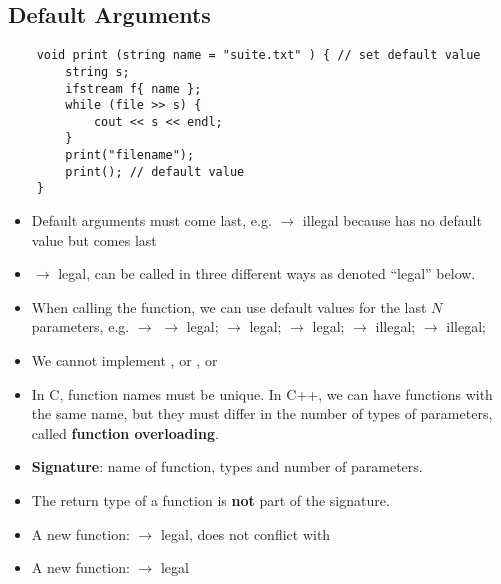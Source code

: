 \subsection{Default Arguments}
\begin{lstlisting}
    void print (string name = "suite.txt" ) { // set default value
        string s;
        ifstream f{ name };
        while (file >> s) {
            cout << s << endl;
        }
        print("filename");
        print(); // default value
    }
\end{lstlisting}
\begin{itemize}
    \item Default arguments must come last, e.g. 
    $ \rightarrow $  illegal because  has no default value but comes last
    \item {} $ \rightarrow $ legal,
    can be called in three different ways as denoted ``legal'' below.
    \item When calling the function, we can use default values for the last
    $ N $ parameters, e.g. $ \rightarrow $ 
    \subitem {} $ \rightarrow $ legal;
    \subitem {} $ \rightarrow $ legal;
    \subitem {} $ \rightarrow $ legal;
    \subitem {} $ \rightarrow $ illegal;
    \subitem {} $ \rightarrow $ illegal;
    \item We cannot implement , or , or
    \item In C, function names must be unique. In C++, we can have functions with
    the same name, but they must differ in the number of types of parameters,
    called \textbf{function overloading}. 
    \item \textbf{Signature}: name of function, types and number of parameters.
    \item The return type of a function is \textbf{not} part of the signature.
    \item A new function:  $ \rightarrow $ legal,
    does not conflict with 
    \item A new function:  $ \rightarrow $ legal
\end{itemize}

